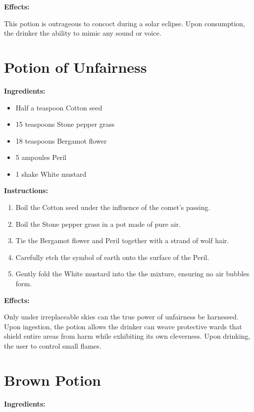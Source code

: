 \documentclass{article}
\begin{document}
\textbf{Effects:}

This potion is outrageous to concoct during a solar eclipse. Upon consumption, the drinker the ability to mimic any sound or voice.

\newpage
\section*{Potion of Unfairness}

\textbf{Ingredients:}

\begin{itemize}
  \item Half a teaspoon Cotton seed
  \item 15 teaspoons Stone pepper grass
  \item 18 teaspoons Bergamot flower
  \item 5 ampoules Peril
  \item 1 shake White mustard
\end{itemize}

\textbf{Instructions:}

\begin{enumerate}
  \item Boil the Cotton seed under the influence of the comet’s passing.
  \item Boil the Stone pepper grass in a pot made of pure air.
  \item Tie the Bergamot flower and Peril together with a strand of wolf hair.
  \item Carefully etch the symbol of earth onto the surface of the Peril.
  \item Gently fold the White mustard into the the mixture, ensuring no air bubbles form.
\end{enumerate}

\textbf{Effects:}

Only under irreplaceable skies can the true power of unfairness be harnessed. Upon ingestion, the potion allows the drinker can weave protective wards that shield entire areas from harm while exhibiting its own cleverness. Upon drinking, the user to control small flames.

\newpage
\section*{Brown Potion}

\textbf{Ingredients:}
\end{document}
